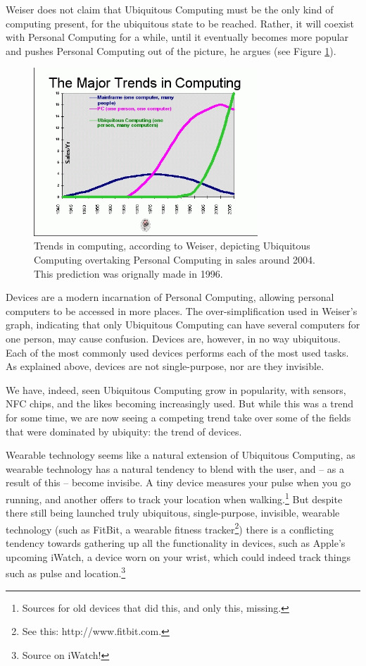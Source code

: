 Weiser does not claim that Ubiquitous Computing must be the only kind of computing present, for the ubiquitous state to be reached.
Rather, it will coexist with Personal Computing for a while, until it eventually becomes more popular and pushes Personal Computing
out of the picture, he argues (see Figure \ref{fig:trends-graph}).

\begin{figure}[ht]
	\centering
	\includegraphics[width=0.75\textwidth]{multipurpose/trends-graph}
	\caption{Trends in computing, according to Weiser, depicting Ubiquitous Computing overtaking Personal Computing in sales around
		2004. This prediction was orignally made in 1996.\cite{weisernomadic}}
	\label{fig:trends-graph}
\end{figure}

Devices are a modern incarnation of Personal Computing, allowing personal computers to be accessed in more places. The over-simplification
used in Weiser's graph, indicating that only Ubiquitous Computing can have several computers for one person, may cause confusion. Devices
are, however, in no way ubiquitous. Each of the most commonly used devices performs each of the most used tasks. As explained above, devices
are not single-purpose, nor are they invisible.

We have, indeed, seen Ubiquitous Computing grow in popularity, with sensors, NFC chips, and the likes becoming increasingly used. But
while this was a trend for some time, we are now seeing a competing trend take over some of the fields that were dominated by ubiquity:
the trend of devices.

Wearable technology seems like a natural extension of Ubiquitous Computing, as wearable technology has a natural tendency to blend with
the user, and -- as a result of this -- become invisibe. A tiny device measures your pulse when you go running, and another offers
to track your location when walking.\footnote{Sources for old devices that did this, and only this, missing.} But despite there still
being launched truly ubiquitous, single-purpose, invisible, wearable technology (such as FitBit, a wearable fitness tracker\footnote{See
this: http://www.fitbit.com.}) there is a conflicting tendency towards gathering up all the functionality in devices, such as Apple's
upcoming iWatch, a device worn on your wrist, which could indeed track things such as pulse and location.\footnote{Source on iWatch!}

